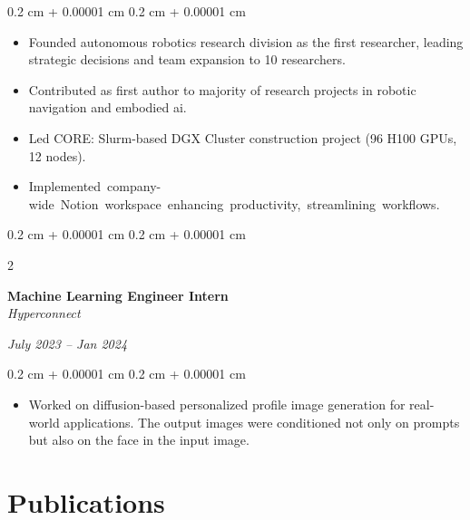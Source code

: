 \documentclass[10pt, letterpaper]{article}
\newenvironment{highlights}{
    \begin{itemize}[
        topsep=0.10 cm,
        parsep=0.10 cm,
        partopsep=0pt,
        itemsep=0pt,
        leftmargin=0.4 cm + 10pt
    ]
}{
    \end{itemize}
} %
\newenvironment{onecolentry}{
    \begin{adjustwidth}{
        0.2 cm + 0.00001 cm
    }{
        0.2 cm + 0.00001 cm
    }
}{
    \end{adjustwidth}
} %
\newenvironment{twocolentry}[2][]{
    \onecolentry
    \def\secondColumn{#2}
    \setcolumnwidth{\fill, 4.5 cm}
    \begin{paracol}{2}
}{
    \switchcolumn \raggedleft \secondColumn
    \end{paracol}
    \endonecolentry
} %
\newenvironment{pubentry}[2][]{
    \onecolentry
    \def\secondColumn{#2}
    \setcolumnwidth{\fill, 2 cm}
    \begin{paracol}{2}
}{
    \switchcolumn \raggedleft \secondColumn
    \end{paracol}
    \endonecolentry
} %
\let\hrefWithoutArrow\href
\renewcommand{\href}[2]{\hrefWithoutArrow{#1}{\ifthenelse{\equal{#2}{}}{ }{#2 }\raisebox{.15ex}{\footnotesize \faExternalLink*}}}
\begin{document}
\vspace{0.10 cm}
\begin{onecolentry}
    \begin{highlights}
        \item Founded autonomous robotics research division as the first researcher, leading strategic decisions and team expansion to 10 researchers.
        \item Contributed as first author to majority of research projects in robotic navigation and embodied ai.
        \item Led CORE: Slurm-based DGX Cluster construction project (96 H100 GPUs, 12 nodes). \href{https://worv.ghost.io/core-construction/}{[Blog]}
        \item \mbox{Implemented company-wide Notion workspace enhancing productivity, streamlining workflows.} \href{https://milkclouds.notion.site/DBs-template-1816b908318e809e9f93ecbfe7d4ca86}{[Template]}
    \end{highlights}
\end{onecolentry}

\vspace{0.2 cm}

\begin{twocolentry}{
        \textit{July 2023 – Jan 2024}
    }
    \textbf{Machine Learning Engineer Intern}
    \\
    \textit{Hyperconnect}
\end{twocolentry}

\vspace{0.10 cm}
\begin{onecolentry}
    \begin{highlights}
        \item Worked on diffusion-based personalized profile image generation for real-world applications. The output images were conditioned not only on prompts but also on the face in the input image.
    \end{highlights}
\end{onecolentry}

\section{Publications}

%
%
%
%
\end{document}
